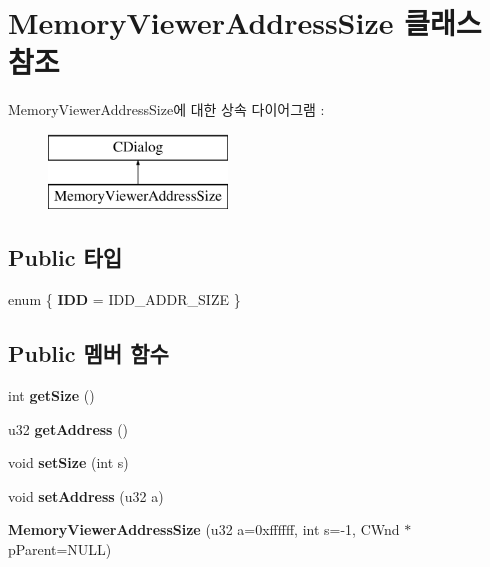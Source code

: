 \hypertarget{class_memory_viewer_address_size}{}\section{Memory\+Viewer\+Address\+Size 클래스 참조}
\label{class_memory_viewer_address_size}
Memory\+Viewer\+Address\+Size에 대한 상속 다이어그램 \+: \begin{figure}[H]
\begin{center}
\leavevmode
\includegraphics[height=2.000000cm]{class_memory_viewer_address_size}
\end{center}
\end{figure}
\subsection*{Public 타입}
\begin{DoxyCompactItemize}
\item 
\mbox{\label{class_memory_viewer_address_size_a20a7438413cb28be1f8a838f6f07dd1a}} 
enum \{ {\bfseries I\+DD} = I\+D\+D\+\_\+\+A\+D\+D\+R\+\_\+\+S\+I\+ZE
 \}
\end{DoxyCompactItemize}
\subsection*{Public 멤버 함수}
\begin{DoxyCompactItemize}
\item 
\mbox{\label{class_memory_viewer_address_size_ade3cfceb89cd35954e57d10dba882eb1}} 
int {\bfseries get\+Size} ()
\item 
\mbox{\label{class_memory_viewer_address_size_a3d31492056e5b255aa882f7732671c4c}} 
u32 {\bfseries get\+Address} ()
\item 
\mbox{\label{class_memory_viewer_address_size_a20e77ae46d654fc217b381d6d8aac00d}} 
void {\bfseries set\+Size} (int s)
\item 
\mbox{\label{class_memory_viewer_address_size_adb284f02039e70a6b0c44e0bacf9feff}} 
void {\bfseries set\+Address} (u32 a)
\item 
\mbox{\label{class_memory_viewer_address_size_a84ec64f3339841082887f5566ce68d19}} 
{\bfseries Memory\+Viewer\+Address\+Size} (u32 a=0xffffff, int s=-\/1, C\+Wnd $\ast$p\+Parent=\+N\+U\+L\+L)
\end{DoxyCompactItemize}

